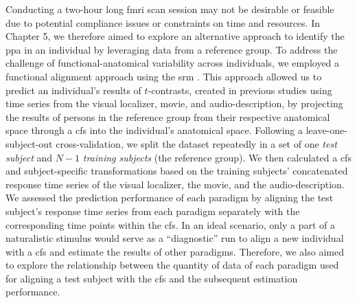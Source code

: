 %
Conducting a two-hour long \ac{fmri} scan session may not be desirable or
feasible due to potential compliance issues or constraints on time and
resources.
%
In Chapter 5, we therefore aimed to explore an alternative approach to identify
the \ac{ppa} in an individual by leveraging data from a reference group.
%
To address the challenge of functional-anatomical variability across
individuals, we employed a functional alignment approach using the \acf{srm}
\citep{chen2015reduced}.
%
This approach allowed us to predict an individual's results of $t$-contrasts,
created in previous studies using time series from the visual localizer, movie,
and audio-description, by projecting the results of persons in the reference
group from their respective anatomical space through a \ac{cfs} into the
individual's anatomical space.
%
Following a leave-one-subject-out cross-validation, we split the dataset
repeatedly in a set of one \textit{test subject} and $N-1$ \textit{training
subjects} (the reference group).
%
We then calculated a \ac{cfs} and subject-specific transformations based on the
training subjects' concatenated response time series of the visual localizer,
the movie, and the audio-description.
%
We assessed the prediction performance of each paradigm by aligning the test
subject's response time series from each paradigm separately with the
corresponding time points within the \ac{cfs}.
%
In an ideal scenario, only a part of a naturalistic stimulus would serve as a
``diagnostic'' run to align a new individual with a \ac{cfs} and estimate the
results of other paradigms.
%
Therefore, we also aimed to explore the relationship between the quantity of
data of each paradigm used for aligning a test subject with the \ac{cfs} and the
subsequent estimation performance.

